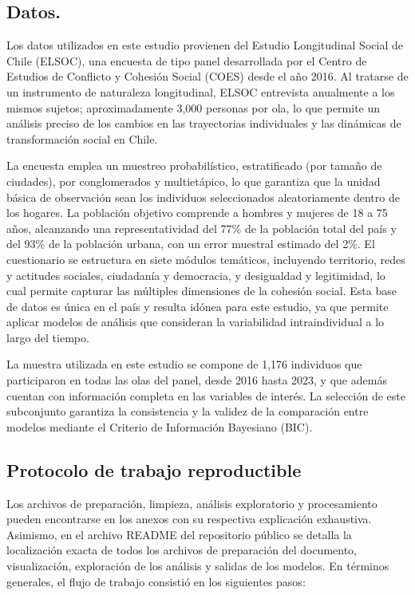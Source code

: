 \documentclass[
  spanish,
  a4paper,
  oneside]{scrbook}
\begin{document}
\subsection{Datos.}\label{datos.}

Los datos utilizados en este estudio provienen del Estudio Longitudinal
Social de Chile (ELSOC), una encuesta de tipo panel desarrollada por el
Centro de Estudios de Conflicto y Cohesión Social (COES) desde el año
2016. Al tratarse de un instrumento de naturaleza longitudinal, ELSOC
entrevista anualmente a los mismos sujetos; aproximadamente 3,000
personas por ola, lo que permite un análisis preciso de los cambios en
las trayectorias individuales y las dinámicas de transformación social
en Chile.

La encuesta emplea un muestreo probabilístico, estratificado (por tamaño
de ciudades), por conglomerados y multietápico, lo que garantiza que la
unidad básica de observación sean los individuos seleccionados
aleatoriamente dentro de los hogares. La población objetivo comprende a
hombres y mujeres de 18 a 75 años, alcanzando una representatividad del
77\% de la población total del país y del 93\% de la población urbana,
con un error muestral estimado del 2\%. El cuestionario se estructura en
siete módulos temáticos, incluyendo territorio, redes y actitudes
sociales, ciudadanía y democracia, y desigualdad y legitimidad, lo cual
permite capturar las múltiples dimensiones de la cohesión social. Esta
base de datos es única en el país y resulta idónea para este estudio, ya
que permite aplicar modelos de análisis que consideran la variabilidad
intraindividual a lo largo del tiempo.

La muestra utilizada en este estudio se compone de 1,176 individuos que
participaron en todas las olas del panel, desde 2016 hasta 2023, y que
además cuentan con información completa en las variables de interés. La
selección de este subconjunto garantiza la consistencia y la validez de
la comparación entre modelos mediante el Criterio de Información
Bayesiano (BIC).

\subsection{Protocolo de trabajo
reproductible}\label{protocolo-de-trabajo-reproductible}

Los archivos de preparación, limpieza, análisis exploratorio y
procesamiento pueden encontrarse en los anexos con su respectiva
explicación exhaustiva. Asimismo, en el archivo README del repositorio
público se detalla la localización exacta de todos los archivos de
preparación del documento, visualización, exploración de los análisis y
salidas de los modelos. En términos generales, el flujo de trabajo
consistió en los siguientes pasos:
\end{document}
